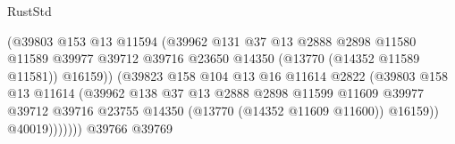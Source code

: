 \begin{lexlean}{RustStd}
\begin{coremodule}
                                            (@39803
                                              @153
                                              @13
                                              @11594
                                              (@39962
                                                @131
                                                @37
                                                @13
                                                @2888
                                                @2898
                                                @11580
                                                @11589
                                                @39977
                                                @39712
                                                @39716
                                                @23650
                                                @14350
                                                (@13770 (@14352 @11589 @11581))
                                                @16159))
                                            (@39823
                                              @158
                                              @104
                                              @13
                                              @16
                                              @11614
                                              @2822
                                              (@39803
                                                @158
                                                @13
                                                @11614
                                                (@39962
                                                  @138
                                                  @37
                                                  @13
                                                  @2888
                                                  @2898
                                                  @11599
                                                  @11609
                                                  @39977
                                                  @39712
                                                  @39716
                                                  @23755
                                                  @14350
                                                  (@13770 (@14352 @11609 @11600))
                                                  @16159))
                                              @40019)))))))
                                @39766
                                @39769

\end{coremodule}
\end{lexlean}
